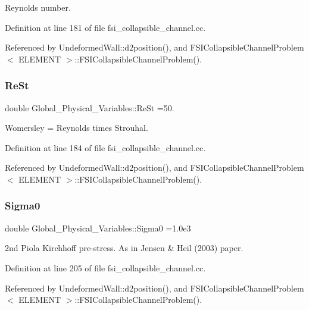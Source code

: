 Reynolds number. 



Definition at line 181 of file fsi\+\_\+collapsible\+\_\+channel.\+cc.



Referenced by Undeformed\+Wall\+::d2position(), and F\+S\+I\+Collapsible\+Channel\+Problem$<$ E\+L\+E\+M\+E\+N\+T $>$\+::\+F\+S\+I\+Collapsible\+Channel\+Problem().

\mbox{\label{namespaceGlobal__Physical__Variables_a085ee4bf968ffdd01a41b8c41864f907}} 
\subsubsection{\texorpdfstring{Re\+St}{ReSt}}
{\footnotesize\ttfamily double Global\+\_\+\+Physical\+\_\+\+Variables\+::\+Re\+St =50.}



Womersley = Reynolds times Strouhal. 



Definition at line 184 of file fsi\+\_\+collapsible\+\_\+channel.\+cc.



Referenced by Undeformed\+Wall\+::d2position(), and F\+S\+I\+Collapsible\+Channel\+Problem$<$ E\+L\+E\+M\+E\+N\+T $>$\+::\+F\+S\+I\+Collapsible\+Channel\+Problem().

\mbox{\label{namespaceGlobal__Physical__Variables_a417dc688a70c4f06ef0faed047068ba2}} 
\subsubsection{\texorpdfstring{Sigma0}{Sigma0}}
{\footnotesize\ttfamily double Global\+\_\+\+Physical\+\_\+\+Variables\+::\+Sigma0 =1.\+0e3}



2nd Piola Kirchhoff pre-\/stress. As in Jensen \& Heil (2003) paper. 



Definition at line 205 of file fsi\+\_\+collapsible\+\_\+channel.\+cc.



Referenced by Undeformed\+Wall\+::d2position(), and F\+S\+I\+Collapsible\+Channel\+Problem$<$ E\+L\+E\+M\+E\+N\+T $>$\+::\+F\+S\+I\+Collapsible\+Channel\+Problem().

